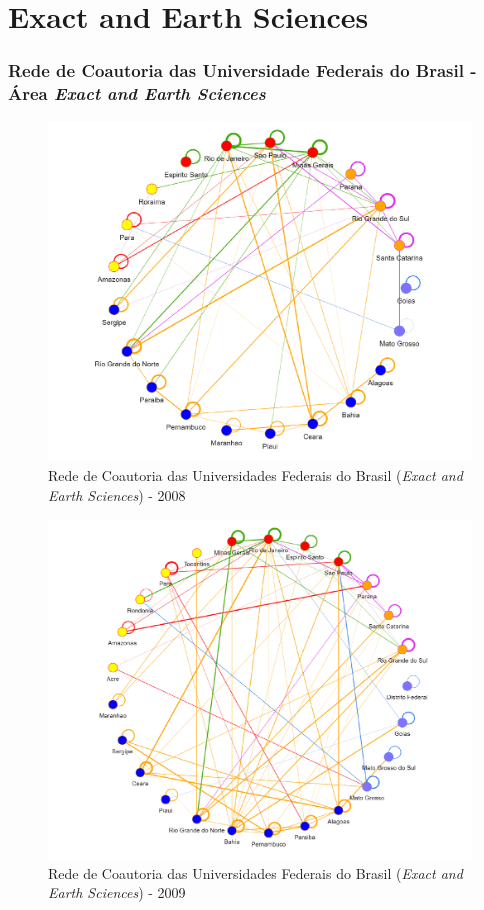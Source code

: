 
\section{\textbf{Exact and Earth Sciences}}

\subsubsection{Rede de Coautoria das Universidade Federais do Brasil - Área \textit{Exact and Earth Sciences}}


\begin{figure}[H]
	\centering
	\includegraphics[scale=0.6]{Imagens/rede-exact-br-2008.pdf}
	\caption{Rede de Coautoria das Universidades Federais do Brasil (\textit{Exact and Earth Sciences}) - 2008}
	\label{Rede de Coautoria - UF EXACT BR 2008}
\end{figure}

\begin{figure}[H]
	\centering
	\includegraphics[scale=0.6]{Imagens/rede-exact-br-2009.pdf}
	\caption{Rede de Coautoria das Universidades Federais do Brasil (\textit{Exact and Earth Sciences}) - 2009}
	\label{Rede de Coautoria - UF EXACT BR 2009}
\end{figure}

